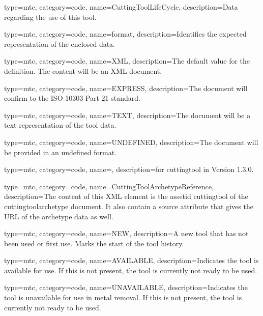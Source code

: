 {
  type=mtc,
  category=code,
  name={CuttingToolLifeCycle},
  description={Data regarding the use of this tool.}
}

{
  type=mtc,
  category=code,
  name={format},
  description={Identifies the expected representation of the enclosed data.}
}

{
  type=mtc,
  category=code,
  name={XML},
  description={The default value for the definition. The content will be an XML document.}
}

{
  type=mtc,
  category=code,
  name={EXPRESS},
  description={The document will confirm to the ISO 10303 Part 21 standard.}
}

{
  type=mtc,
  category=code,
  name={TEXT},
  description={The document will be a text representation of the tool data.}
}

{
  type=mtc,
  category=code,
  name={UNDEFINED},
  description={The document will be provided in an undefined format.}
}

{
  type=mtc,
  category=code,
  name=,
  description={\DEPRECATED for \gls{cuttingtool} in Version 1.3.0. 
  \newline {}}
}

{
  type=mtc,
  category=code,
  name={CuttingToolArchetypeReference},
  description={The content of this XML element is the \gls{assetid cuttingtool} of the \gls{cuttingtoolarchetype} document. It \MAY also contain a source attribute that gives the URL of the archetype data as well.}
}

{
  type=mtc,
  category=code,
  name={NEW},
  description={A new tool that has not been used or first use. Marks the start of the tool history.}
}

{
  type=mtc,
  category=code,
  name={AVAILABLE},
  description={Indicates the tool is available for use. If this is not present, the tool is currently not ready to be used.}
}

{
  type=mtc,
  category=code,
  name={UNAVAILABLE},
  description={Indicates the tool is unavailable for use in metal removal. If this is not present, the tool is currently not ready to be used.}
}

